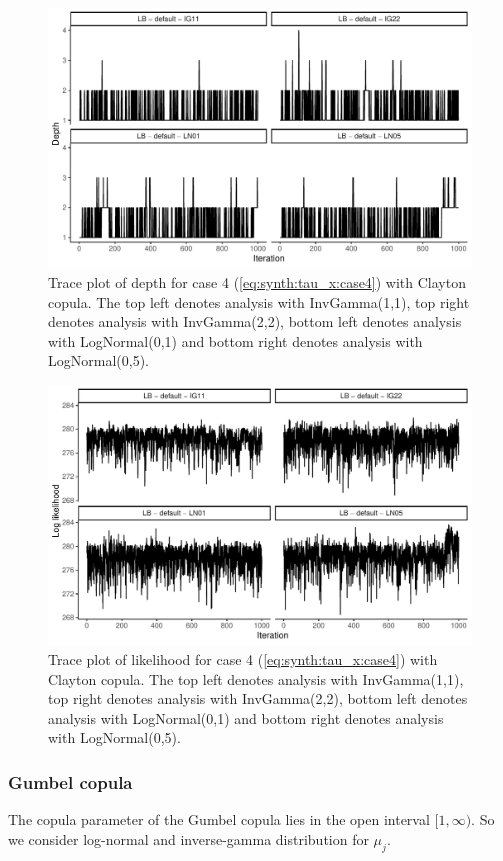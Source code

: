 \documentclass{amsart}
\begin{document}
\begin{figure}
	\centering
	\includegraphics[width = 0.75\linewidth]{trace_case4_clayton_depth.pdf}
	\caption{Trace plot of depth for case 4 (\cref{eq:synth:tau_x:case4}) with Clayton copula. The top left denotes analysis with InvGamma(1,1), top right denotes analysis with InvGamma(2,2), bottom left denotes analysis with LogNormal(0,1) and bottom right denotes analysis with LogNormal(0,5).}
	\label{fig:case4:clayton:depth}
\end{figure}

\begin{figure}
	\centering
	\includegraphics[width = 0.75\linewidth]{trace_case4_clayton_like.pdf}
	\caption{Trace plot of likelihood for case 4 (\cref{eq:synth:tau_x:case4}) with Clayton copula. The top left denotes analysis with InvGamma(1,1), top right denotes analysis with InvGamma(2,2), bottom left denotes analysis with LogNormal(0,1) and bottom right denotes analysis with LogNormal(0,5).}
	\label{fig:case4:clayton:like}
\end{figure}

\subsubsection{Gumbel copula} The copula parameter of the Gumbel copula lies in the open interval $[1,\infty)$. So we consider log-normal and inverse-gamma distribution for $\mu_j$.
\end{document}

